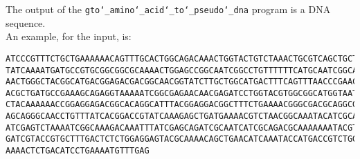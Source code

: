 The output of the \texttt{gto\char`_amino\char`_acid\char`_to\char`_pseudo\char`_dna} program is a DNA sequence.\\
An example, for the input, is:
\begin{lstlisting}
ATCCCGTTTCTGCTGAAAAAACAGTTTGCACTGGCAGACAAACTGGTACTGTCTAAACTGCGTCAGCTGCTGGGCGGCCG
TATCAAAATGATGCCGTGCGGCGGCGCAAAACTGGAGCCGGCAATCGGCCTGTTTTTTCATGCAATCGGCATCAACATCA
AACTGGGCTACGGCATGACGGAGACGACGGCAACGGTATCTTGCTGGCATGACTTTCAGTTTAACCCGAACTCTATCGGC
ACGCTGATGCCGAAAGCAGAGGTAAAAATCGGCGAGAACAACGAGATCCTGGTACGTGGCGGCATGGTAATGAAAGGCTA
CTACAAAAAACCGGAGGAGACGGCACAGGCATTTACGGAGGACGGCTTTCTGAAAACGGGCGACGCAGGCGAGTTTGACG
AGCAGGGCAACCTGTTTATCACGGACCGTATCAAAGAGCTGATGAAAACGTCTAACGGCAAATACATCGCACCGCAGTAC
ATCGAGTCTAAAATCGGCAAAGACAAATTTATCGAGCAGATCGCAATCATCGCAGACGCAAAAAAATACGTATCTGCACT
GATCGTACCGTGCTTTGACTCTCTGGAGGAGTACGCAAAACAGCTGAACATCAAATACCATGACCGTCTGGAGCTGCTGA
AAAACTCTGACATCCTGAAAATGTTTGAG
\end{lstlisting}
